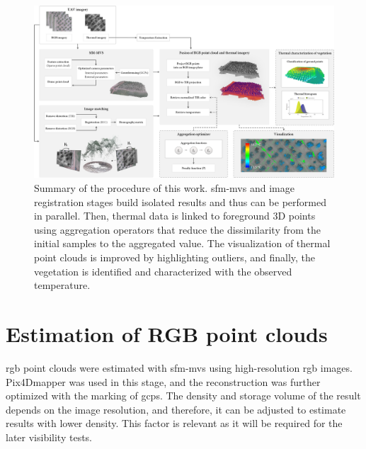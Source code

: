 \begin{figure}
    \centering
    \caption{Summary of the procedure of this work. \acrshort{sfm}-\acrshort{mvs} and image registration stages build isolated results and thus can be performed in parallel. Then, thermal data is linked to foreground 3D points using aggregation operators that reduce the dissimilarity from the initial samples to the aggregated value. The visualization of thermal point clouds is improved by highlighting outliers, and finally, the vegetation is identified and characterized with the observed temperature. }
    \label{fig:thermal_projection_overview}
    \includegraphics[width=.9\linewidth]{figs/thermal_projection/thermal_projection.png}
\end{figure}

\section{Estimation of RGB point clouds}

\acrshort{rgb} point clouds were estimated with \acrshort{sfm}-\acrshort{mvs} using high-resolution \acrshort{rgb} images. Pix4Dmapper was used in this stage, and the reconstruction was further optimized with the marking of \acrshort{gcp}s. The density and storage volume of the result depends on the image resolution, and therefore, it can be adjusted to estimate results with lower density. This factor is relevant as it will be required for the later visibility tests.

